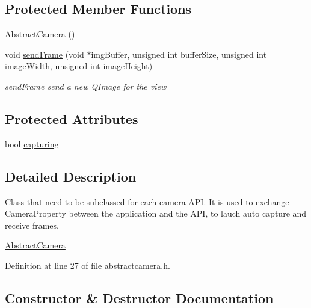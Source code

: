 \subsection*{Protected Member Functions}
\begin{DoxyCompactItemize}
\item 
\mbox{\hyperlink{class_abstract_camera_a68e6ddb404a4a4e9aafc97e08f2c84ea}{Abstract\+Camera}} ()
\item 
void \mbox{\hyperlink{class_abstract_camera_a75a673fee75a95e52adf4a15cd5310c4}{send\+Frame}} (void $\ast$img\+Buffer, unsigned int buffer\+Size, unsigned int image\+Width, unsigned int image\+Height)
\begin{DoxyCompactList}\small\item\em send\+Frame send a new Q\+Image for the view \end{DoxyCompactList}\end{DoxyCompactItemize}
\subsection*{Protected Attributes}
\begin{DoxyCompactItemize}
\item 
bool \mbox{\hyperlink{class_abstract_camera_a8fa772437cbf23ba88f38c6e5b9f64d8}{capturing}}
\end{DoxyCompactItemize}


\subsection{Detailed Description}
Class that need to be subclassed for each camera A\+PI. It is used to exchange Camera\+Property between the application and the A\+PI, to lauch auto capture and receive frames. 

\mbox{\hyperlink{class_abstract_camera}{Abstract\+Camera}} 

Definition at line 27 of file abstractcamera.\+h.



\subsection{Constructor \& Destructor Documentation}
\mbox{\label{class_abstract_camera_addf550f9f41d04bd6651b19d795bdabe}} 
